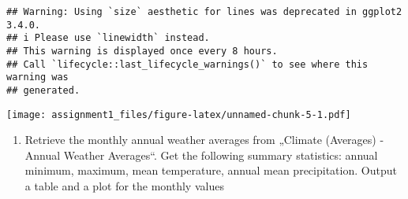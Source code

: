 \documentclass[
]{article}
\providecommand{\tightlist}{%
  \setlength{\itemsep}{0pt}\setlength{\parskip}{0pt}}
\begin{document}
\begin{verbatim}
## Warning: Using `size` aesthetic for lines was deprecated in ggplot2 3.4.0.
## i Please use `linewidth` instead.
## This warning is displayed once every 8 hours.
## Call `lifecycle::last_lifecycle_warnings()` to see where this warning was
## generated.
\end{verbatim}

\texttt{[image: assignment1\_files/figure-latex/unnamed-chunk-5-1.pdf]}

\begin{enumerate}
\def\labelenumi{\alph{enumi})}
\setcounter{enumi}{2}
\tightlist
\item
  Retrieve the monthly annual weather averages from „Climate (Averages)
  - Annual Weather Averages``. Get the following summary statistics:
  annual minimum, maximum, mean temperature, annual mean precipitation.
  Output a table and a plot for the monthly values
\end{enumerate}
\end{document}
